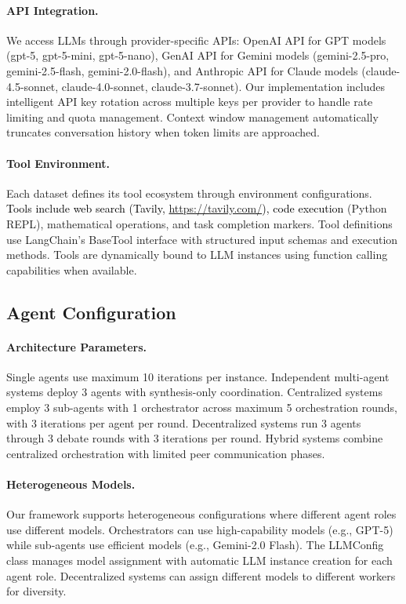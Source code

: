 \paragraph{API Integration.}

We access LLMs through provider-specific APIs: OpenAI API for GPT models (gpt-5, gpt-5-mini, gpt-5-nano), GenAI API for Gemini models (gemini-2.5-pro, gemini-2.5-flash, gemini-2.0-flash), and Anthropic API for Claude models (claude-4.5-sonnet, claude-4.0-sonnet, claude-3.7-sonnet). Our implementation includes intelligent API key rotation across multiple keys per provider to handle rate limiting and quota management. Context window management automatically truncates conversation history when token limits are approached.

\paragraph{Tool Environment.}
Each dataset defines its tool ecosystem through environment configurations. \textcolor{black}{Tools include web search (Tavily, \url{https://tavily.com/}), code execution} (Python REPL), mathematical operations, and task
completion markers. Tool definitions use LangChain's BaseTool interface with structured input schemas and execution methods. Tools are dynamically bound to LLM instances using
function calling capabilities when available.

\subsection{Agent Configuration}

\paragraph{Architecture Parameters.}
Single agents use maximum 10 iterations per instance. Independent multi-agent systems deploy 3 agents with synthesis-only coordination. Centralized systems employ 3 sub-agents with 1 orchestrator across maximum 5 orchestration rounds, with 3 iterations per agent per round. Decentralized systems run 3 agents through 3 debate rounds with 3 iterations per round. Hybrid systems combine centralized orchestration with limited peer communication phases.

\paragraph{Heterogeneous Models.}
Our framework supports heterogeneous configurations where different agent roles use different models. Orchestrators can use high-capability models (e.g., GPT-5) while sub-agents use
efficient models (e.g., Gemini-2.0 Flash). The LLMConfig class manages model assignment with automatic LLM instance creation for each agent role. Decentralized systems can assign
different models to different workers for diversity.

